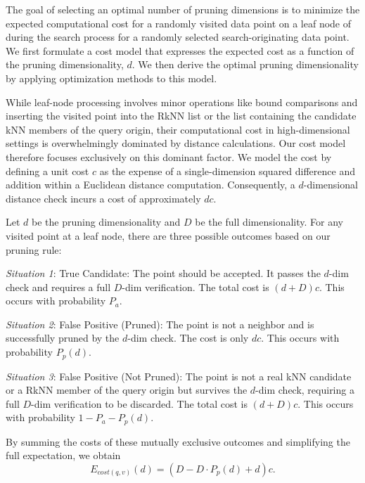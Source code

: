 The goal of selecting an optimal number of pruning dimensions is to minimize the expected computational cost for a randomly visited data point on a leaf node of \dualtree during the search process for a randomly selected search-originating data point. We first formulate a cost model that expresses the expected cost as a function of the pruning dimensionality, $d$. We then derive the optimal pruning dimensionality by applying optimization methods to this model.

While leaf-node processing involves minor operations like bound comparisons and inserting the visited point into the RkNN list or the list containing the candidate kNN members of the query origin, their computational cost in high-dimensional settings is overwhelmingly dominated by distance calculations. Our cost model therefore focuses exclusively on this dominant factor. We model the cost by defining a unit cost $c$ as the expense of a single-dimension squared difference and addition within a Euclidean distance computation. Consequently, a $d$-dimensional distance check incurs a cost of approximately $dc$.

Let $d$ be the pruning dimensionality and $D$ be the full dimensionality. For any visited point at a leaf node, there are three possible outcomes based on our pruning rule:

\noindent \textit{Situation 1}: True Candidate: The point should be accepted. It passes the $d$-dim check and requires a full $D$-dim verification. The total cost is $(d+D)c$. This occurs with probability $P_a$.

\noindent \textit{Situation 2}: False Positive (Pruned): The point is not a neighbor and is successfully pruned by the $d$-dim check. The cost is only $dc$. This occurs with probability $P_p(d)$.

\noindent \textit{Situation 3}: False Positive (Not Pruned): The point is not a real kNN candidate or a RkNN member of the query origin but survives the $d$-dim check, requiring a full $D$-dim verification to be discarded. The total cost is $(d+D)c$. This occurs with probability $1 - P_a - P_p(d)$.


By summing the costs of these mutually exclusive outcomes and simplifying the full expectation, we obtain
\begin{equation}
E_{cost(q,v)}(d)=(D-D\cdot P_p(d)+d)c .
\end{equation}

